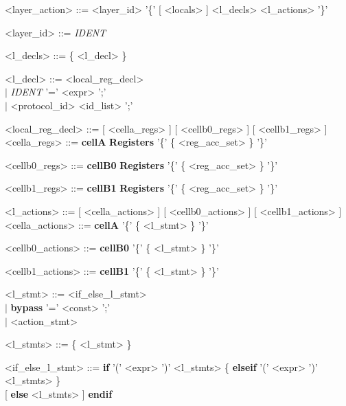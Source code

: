 \documentclass{article}
\begin{document}
\begin{grammar} \small

{\renewcommand\baselinestretch{0}\selectfont
<layer\_action>   ::= <layer\_id> '\{' [ <locals> ] <l\_decls>  <l\_actions> '\}'

<layer\_id>     ::=   \emph{IDENT}

<l\_decls>     ::=   \{ <l\_decl>  \}

<l\_decl>     ::=   <local\_reg\_decl>  \\
     \hspace*{0.8cm} $\mid$  \emph{IDENT} '=' <expr> ';' \\
     \hspace*{0.8cm} $\mid$  <protocol\_id> <id\_list> ';'

<local\_reg\_decl>     ::=    [ <cella\_regs> ]  [ <cellb0\_regs> ]  [ <cellb1\_regs> ] \\

<cella\_regs>     ::=    \textbf{cellA} \textbf{Registers} '\{' \{ <reg\_acc\_set> \} '\}'

<cellb0\_regs>     ::=    \textbf{cellB0} \textbf{Registers} '\{' \{ <reg\_acc\_set> \} '\}'

<cellb1\_regs>     ::=    \textbf{cellB1} \textbf{Registers} '\{' \{ <reg\_acc\_set> \} '\}'

<l\_actions>     ::=    [ <cella\_actions> ]  [ <cellb0\_actions> ]  [ <cellb1\_actions> ] \\

<cella\_actions>     ::=    \textbf{cellA} '\{' \{ <l\_stmt> \} '\}'

<cellb0\_actions>     ::=    \textbf{cellB0} '\{' \{ <l\_stmt> \} '\}'

<cellb1\_actions>     ::=    \textbf{cellB1} '\{' \{ <l\_stmt> \} '\}'

<l\_stmt>     ::=   <if\_else\_l\_stmt> \\
     \hspace*{0.88cm} $\mid$  \textbf{bypass} '=' <const> ';' \\
     \hspace*{0.88cm} $\mid$  <action\_stmt>

<l\_stmts>     ::=   \{ <l\_stmt>  \}

<if\_else\_l\_stmt>     ::=   \textbf{if} '(' <expr> ')' <l\_stmts> \{ \textbf{elseif} '(' <expr> ')' <l\_stmts> \} \\
     \hspace*{2.25cm} [ \textbf{else} <l\_stmts> ] \textbf{endif}

}
\end{grammar}
\end{document}
